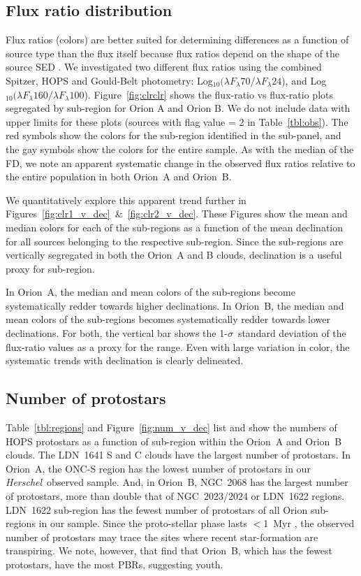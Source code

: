 \documentclass[manuscript]{aastex61}
\newcommand{\herschel}{{\em Herschel}}
\newcommand{\clra}{Log$_{10}(\lambda F_\lambda70/\lambda F_\lambda24$)}
\newcommand{\clrb}{Log$_{10}(\lambda F_\lambda160/\lambda F_\lambda100$)}
\begin{document}
\subsection{Flux ratio distribution}
\label{sec:fratio}
\par
Flux ratios (colors) are better suited for determining differences as a function of source type than the flux itself because flux ratios depend on the shape of the source SED \citep{ali}. We investigated two different flux ratios using the combined Spitzer, HOPS and Gould-Belt photometry: \clra, and \clrb. Figure~\ref{fig:clrclr} shows the flux-ratio vs flux-ratio plots segregated by sub-region for Orion A and Orion B. We do not include data with upper limits for these plots (sources with flag value = 2 in Table~\ref{tbl:obs}). The red symbols show the colors for the sub-region identified in the sub-panel, and the gay symbols show the colors for the entire sample. As with the median of the FD, we note an apparent systematic change in the observed flux ratios relative to the entire population in both Orion~A and Orion~B.
\par
We quantitatively explore this apparent trend further in Figures~\ref{fig:clr1_v_dec}~\&~\ref{fig:clr2_v_dec}. These Figures show the mean and median colors for each of the sub-regions as a function of the mean declination for all sources belonging to the respective sub-region.  Since the sub-regions are vertically segregated in both the Orion~A and B clouds, declination is a useful proxy for sub-region.
\par
In Orion~A, the median and mean colors of the sub-regions become systematically redder towards higher declinations.  In Orion~B, the median and mean colors of the sub-regions becomes systematically redder towards lower declinations.  For both, the vertical bar shows the 1-$\sigma$\ standard deviation of the flux-ratio values as a proxy for the range.  Even with large variation in color, the systematic trends with declination is clearly delineated.

\subsection{Number of protostars}
\label{sec:numbers}
Table~\ref{tbl:regions} and Figure~\ref{fig:num_v_dec} list and show the numbers of HOPS protostars as a function of sub-region within the Orion~A and Orion~B clouds.  The LDN~1641 S and C clouds have the largest number of protostars.  In Orion~A, the ONC-S region has the lowest number of protostars in our \herschel\ observed sample.  And, in Orion~B, NGC~2068 has the largest number of protostars, more than double that of NGC~2023/2024 or LDN~1622 regions.  LDN~1622 sub-region has the fewest number of protostars of all Orion sub-regions in our sample.  Since the proto-stellar phase lasts $<$1~Myr \citep{orion}, the observed number of protostars may trace the sites where recent star-formation are transpiring.  We note, however, that \citet{pbrpaper} find that Orion~B, which has the fewest protostars, have the most PBRs, suggesting youth.
\end{document}
